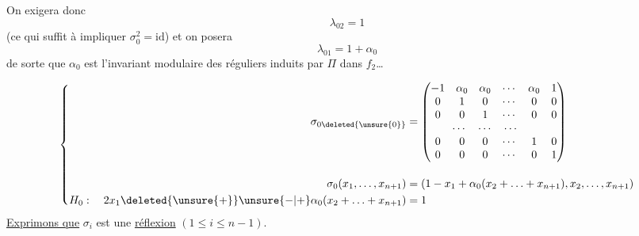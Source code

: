 
On exigera donc
\[
\lambda_{02}=1
\]
 (ce qui suffit à impliquer $\sigma_0^2=\mathrm{id}$) et on posera
\[
\boxed{\lambda_{01}=1+\alpha_0}
\]
de sorte que $\alpha_0$ est l'invariant modulaire des  réguliers induits par $\Pi$ dans $f_2$\ldots

\[
\left\{\begin{aligned}
\sigma_{0\deleted{\unsure{0}}}&=\begin{pmatrix}
-1&\alpha_0&\alpha_0&\cdots&\alpha_0&1\\
0&1&0&\cdots&0&0\\
0&0&1&\cdots&0&0\\
\multicolumn{5}{c}{\cdots\quad\cdots\quad\cdots}&\\
0&0&0&\cdots&1&0\\
0&0&0&\cdots&0&1
\end{pmatrix}\\[1em]
\sigma_0(x_1,\ldots,x_{n+1})&=(1-x_1+\alpha_0(x_2+\ldots+x_{n+1}),x_2,\ldots,x_{n+1})\\
H_0:\quad2x_1\deleted{\unsure{+}}\unsure{-|+}\alpha_0(x_2+\ldots+x_{n+1})&=1
\end{aligned}\right.
\]
\uline{Exprimons que} $\sigma_i$ est une \uline{réflexion} $(1\leq i\leq n-1)$.


